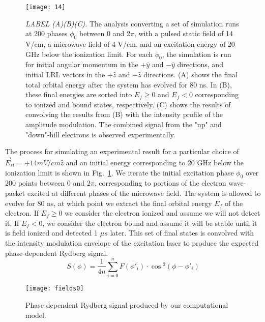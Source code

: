 \documentclass[aps,pra,preprint,groupedaddress]{revtex4-1}
\begin{document}
\begin{figure}
	\texttt{[image: 14]}
	\caption{\emph{LABEL (A)(B)(C).} The analysis converting a set of simulation runs at 200 phases $\phi_0$ between 0 and 2$\pi$, with a pulsed static field of 14 V/cm, a microwave field of 4 V/cm, and an excitation energy of 20 GHz below the ionization limit. For each $\phi_0$, the simulation is run for initial angular momentum in the $+\hat{y}$ and $-\hat{y}$ directions, and initial LRL vectors in the $+\hat{z}$ and $-\hat{z}$ directions. (A) shows the final total orbital energy after the system has evolved for 80 ns. In (B), these final energies are sorted into $E_f\geq 0$ and $E_f<0$ corresponding to ionized and bound states, respectively. (C) shows the results of convolving the results from (B) with the intensity profile of the amplitude modulation. The combined signal from the "up" and "down"-hill electrons is observed experimentally.}
	\label{fig:ModEval}
\end{figure}

The process for simulating an experimental result for a particular choice of $\vec{E}_{st} = + 14 mV/cm \hat{z}$ and an initial energy corresponding to 20 GHz below the ionization limit is shown in Fig.~\ref{fig:ModEval}. We iterate the initial excitation phase $\phi_0$ over 200 points between 0 and $2\pi$, corresponding to portions of the electron wave-packet excited at different phases of the microwave field. The system is allowed to evolve for 80 ns, at which point we extract the final orbital energy $E_f$ of the electron. If $E_f \geq 0$ we consider the electron ionized and assume we will not detect it. If $E_f < 0$, we consider the electron bound and assume it will be stable until it is field ionized and detected 1 $\mu s$ later. This set of final states is convolved with the intensity modulation envelope of the excitation laser to produce the expected phase-dependent Rydberg signal.
\begin{equation}
S(\phi) = \frac{1}{4n} \sum_{i=0}^{n} F(\phi\prime_i) \cdot \cos{^2(\phi - \phi\prime_i)}
\end{equation}

\begin{figure}
\texttt{[image: fields0]}
\caption{Phase dependent Rydberg signal produced by our computational model.}
\label{fig:SimMod}
\end{figure}
\end{document}
